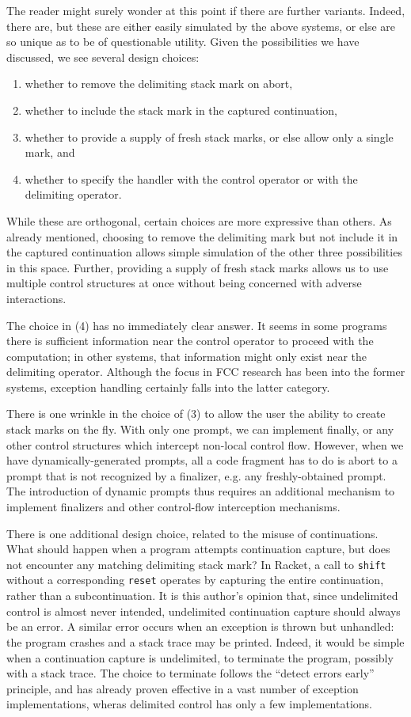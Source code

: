 \documentclass[11pt]{article}
\begin{document}
The reader might surely wonder at this point if there are further variants.
Indeed, there are, but these are either easily simulated by the above systems, or else are so unique as to be of questionable utility.
Given the possibilities we have discussed, we see several design choices:
\begin{enumerate}
\item whether to remove the delimiting stack mark on abort,
\item whether to include the stack mark in the captured continuation,
\item whether to provide a supply of fresh stack marks, or else allow only a single mark, and
\item whether to specify the handler with the control operator or with the delimiting operator.
\end{enumerate}
While these are orthogonal, certain choices are more expressive than others.
As already mentioned, choosing to remove the delimiting mark but not include it in the captured continuation allows simple simulation of the other three possibilities in this space.
Further, providing a supply of fresh stack marks allows us to use multiple control structures at once without being concerned with adverse interactions.

The choice in (4) has no immediately clear answer.
It seems in some programs there is sufficient information near the control operator to proceed with the computation; in other systems, that information might only exist near the delimiting operator.
Although the focus in FCC research has been into the former systems, exception handling certainly falls into the latter category.

There is one wrinkle in the choice of (3) to allow the user the ability to create stack marks on the fly.
With only one prompt, we can implement finally, or any other control structures which intercept non-local control flow.
However, when we have dynamically-generated prompts, all a code fragment has to do is abort to a prompt that is not recognized by a finalizer, e.g. any freshly-obtained prompt.
The introduction of dynamic prompts thus requires an additional mechanism to implement finalizers and other control-flow interception mechanisms.

There is one additional design choice, related to the misuse of continuations.
What should happen when a program attempts continuation capture, but does not encounter any matching delimiting stack mark?
In Racket, a call to \texttt{shift} without a corresponding \texttt{reset} operates by capturing the entire continuation, rather than a subcontinuation.
It is this author's opinion that, since undelimited control is almost never intended, undelimited continuation capture should always be an error.
A similar error occurs when an exception is thrown but unhandled: the program crashes and a stack trace may be printed.
Indeed, it would be simple when a continuation capture is undelimited, to terminate the program, possibly with a stack trace.
The choice to terminate follows the ``detect errors early'' principle, and has already proven effective in a vast number of exception implementations, wheras delimited control has only a few implementations.
\end{document}
